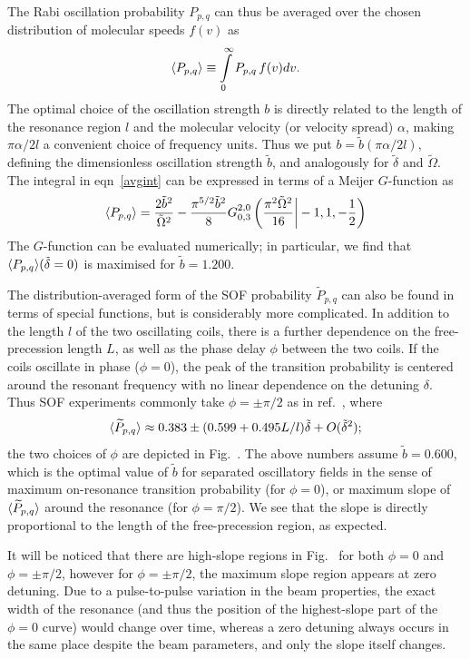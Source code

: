 The Rabi oscillation probability $P_{p,q}$ can thus be averaged over the chosen
distribution of molecular speeds $f(v)$ as
%
\begin{equation}
    \label{effusivef}
    \langle P_{p,q}\rangle\equiv
    \int\limits_0^\infty P_{p,q}\,f(v)dv
    .
\end{equation}
%
The optimal choice of the oscillation strength $b$ is directly related to the
length of the resonance region $l$ and the molecular velocity (or velocity
spread) $\alpha$, making $\pi\alpha/2l$ a convenient choice of frequency units.
Thus we put $b=\tilde b(\pi\alpha/2l)$, defining the dimensionless oscillation
strength $\tilde b$, and analogously for $\tilde\delta$ and $\tilde\Omega$. The
integral in eqn~\ref{avgint} can be expressed in terms of a Meijer $G$-function
\cite[sect~5.3]{erdelyi1953higher} as
%
\[
    \langle P_{p,q}\rangle=
    \frac{2\tilde b^2}{\tilde\Omega^2}
    -\frac{\pi^{5/2}\tilde b^2}{8}
    G_{0,3}^{2,0}\left(
        \frac{\pi^2\tilde\Omega^2}{16}
        \bigg|
        -1,1,-\frac{1}{2}
    \right)
\]
%
The $G$-function can be evaluated numerically; in particular, we find that
$\langle P_{p,q}\rangle(\tilde\delta=0)$ is maximised for $\tilde b=1.200$.

The distribution-averaged form of the \gls{SOF} probability
$\widetilde{P}_{p,q}$ can also be found in terms of special functions, but is
considerably more complicated. In addition to the length $l$ of the two
oscillating coils, there is a further dependence on the free-precession length
$L$, as well as the phase delay $\phi$ between the two coils. If the coils
oscillate in phase ($\phi=0$), the peak of the transition probability is
centered around the resonant frequency with no linear dependence on the detuning
$\delta$. Thus \gls{SOF} experiments commonly take $\phi=\pm\pi/2$ as in
ref.~\cite{ramsey1951phase}, where
%
\[
    \langle \widetilde{P}_{p,q}\rangle
    \approx
    0.383
    \pm(0.599+0.495L/l)\tilde\delta
    +O(\tilde\delta^2);
\]
%
the two choices of $\phi$ are depicted in Fig.~. The above numbers
assume $\tilde b=0.600$, which is the optimal value of $\tilde b$ for separated
oscillatory fields in the sense of maximum on-resonance transition probability
(for $\phi=0$), or maximum slope of $\langle \widetilde{P}_{p,q}\rangle$ around the
resonance (for $\phi=\pi/2$). We see that the slope is directly proportional to
the length of the free-precession region, as expected.

It will be noticed that there are high-slope regions in Fig.~ for
both $\phi=0$ and $\phi=\pm\pi/2$, however for $\phi=\pm\pi/2$, the maximum
slope region appears at zero detuning. Due to a pulse-to-pulse variation in the
beam properties, the exact width of the resonance (and thus the position of the
highest-slope part of the $\phi=0$ curve) would change over time, whereas a zero
detuning always occurs in the same place despite the beam parameters, and only
the slope itself changes.

